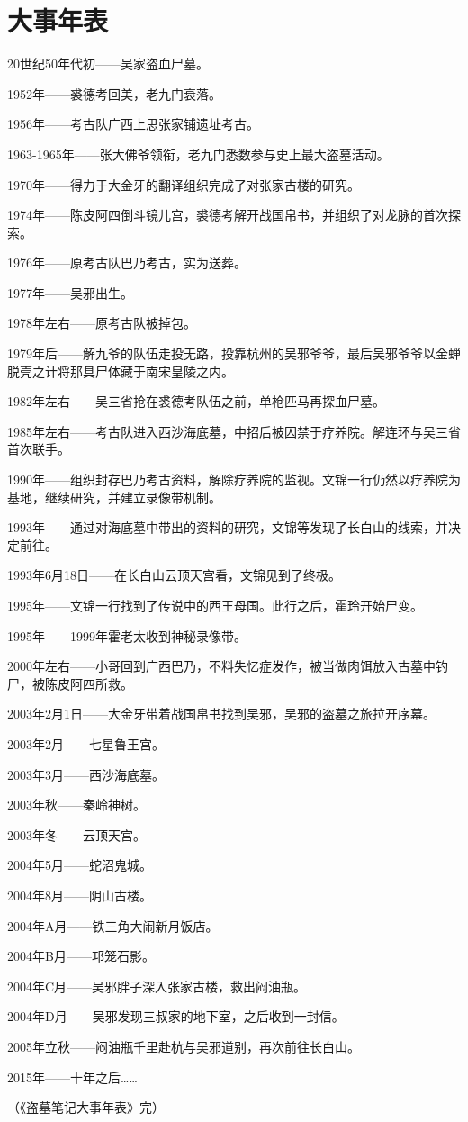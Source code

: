 

\chapter{大事年表 }

20世纪50年代初——吴家盗血尸墓。

1952年——裘德考回美，老九门衰落。

1956年——考古队广西上思张家铺遗址考古。

1963-1965年——张大佛爷领衔，老九门悉数参与史上最大盗墓活动。

1970年——得力于大金牙的翻译组织完成了对张家古楼的研究。

1974年——陈皮阿四倒斗镜儿宫，裘德考解开战国帛书，并组织了对龙脉的首次探索。

1976年——原考古队巴乃考古，实为送葬。

1977年——吴邪出生。

1978年左右——原考古队被掉包。

1979年后——解九爷的队伍走投无路，投靠杭州的吴邪爷爷，最后吴邪爷爷以金蝉脱壳之计将那具尸体藏于南宋皇陵之内。

1982年左右——吴三省抢在裘德考队伍之前，单枪匹马再探血尸墓。

1985年左右——考古队进入西沙海底墓，中招后被囚禁于疗养院。解连环与吴三省首次联手。

1990年——组织封存巴乃考古资料，解除疗养院的监视。文锦一行仍然以疗养院为基地，继续研究，并建立录像带机制。

1993年——通过对海底墓中带出的资料的研究，文锦等发现了长白山的线索，并决定前往。

1993年6月18日——在长白山云顶天宫看，文锦见到了终极。

1995年——文锦一行找到了传说中的西王母国。此行之后，霍玲开始尸变。

1995年——1999年霍老太收到神秘录像带。

2000年左右——小哥回到广西巴乃，不料失忆症发作，被当做肉饵放入古墓中钓尸，被陈皮阿四所救。

2003年2月1日——大金牙带着战国帛书找到吴邪，吴邪的盗墓之旅拉开序幕。

2003年2月——七星鲁王宫。

2003年3月——西沙海底墓。

2003年秋——秦岭神树。

2003年冬——云顶天宫。

2004年5月——蛇沼鬼城。

2004年8月——阴山古楼。

2004年A月——铁三角大闹新月饭店。

2004年B月——邛笼石影。

2004年C月——吴邪胖子深入张家古楼，救出闷油瓶。

2004年D月——吴邪发现三叔家的地下室，之后收到一封信。

2005年立秋——闷油瓶千里赴杭与吴邪道别，再次前往长白山。

2015年——十年之后……

{\fzqiti\hfill （《盗墓笔记大事年表》完）}
